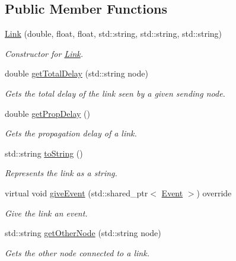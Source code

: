 \subsection*{\-Public \-Member \-Functions}
\begin{DoxyCompactItemize}
\item 
\hyperlink{classLink_af0a6ae4d9767bacfb371f52a30441e64}{\-Link} (double, float, float, std\-::string, std\-::string, std\-::string)
\begin{DoxyCompactList}\small\item\em \-Constructor for \hyperlink{classLink}{\-Link}. \end{DoxyCompactList}\item 
double \hyperlink{classLink_a19a132f87f8028ccd5af2503084aac64}{get\-Total\-Delay} (std\-::string node)
\begin{DoxyCompactList}\small\item\em \-Gets the total delay of the link seen by a given sending node. \end{DoxyCompactList}\item 
double \hyperlink{classLink_a6349999e40910091ecea77e2a366aa46}{get\-Prop\-Delay} ()
\begin{DoxyCompactList}\small\item\em \-Gets the propagation delay of a link. \end{DoxyCompactList}\item 
std\-::string \hyperlink{classLink_a8c768141c7ebf3b852bf978757f903be}{to\-String} ()
\begin{DoxyCompactList}\small\item\em \-Represents the link as a string. \end{DoxyCompactList}\item 
virtual void \hyperlink{classLink_abd9466c4c2097329f4affd9b2eafbd7a}{give\-Event} (std\-::shared\-\_\-ptr$<$ \hyperlink{classEvent}{\-Event} $>$) override
\begin{DoxyCompactList}\small\item\em \-Give the link an event. \end{DoxyCompactList}\item 
std\-::string \hyperlink{classLink_aaa4e4c72a6384f118846765c296e5634}{get\-Other\-Node} (std\-::string node)
\begin{DoxyCompactList}\small\item\em \-Gets the other node connected to a link. \end{DoxyCompactList}\item 

\end{DoxyCompactItemize}
